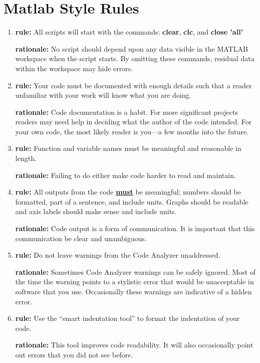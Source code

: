 \documentclass{tufte-book}
\begin{document}
\chapter{Matlab Style Rules}
\begin{enumerate}
\item \textbf{rule:} All scripts will start with the commands: \textbf{clear}, \textbf{clc}, and \textbf{close 'all'}

\textbf{rationale:} No script should depend upon any data visible in the MATLAB workspace when the script starts.  By omitting these commands, residual data within the workspace may hide errors.

\item \textbf{rule:} Your code must be documented with enough details such that a reader unfamiliar with your work will know what you are doing.

\textbf{rationale:} Code documentation is a habit. For more significant projects readers may need help in deciding what the author of the code intended.  For your own code, the most likely reader is you---a few months into the future.

\item \textbf{rule:} Function and variable names must be meaningful and reasonable in length.

\textbf{rationale:} Failing to do either make code harder to read and maintain.

\item \textbf{rule:} All outputs from the code \underline{\textbf{must}} be meaningful; numbers should be formatted, part of a sentence, and include units. Graphs should be readable and axis labels should make sense and include units.

\textbf{rationale:} Code output is a form of communication. It is important that this communication be clear and unambiguous.

\item \textbf{rule:} Do not leave warnings from the Code Analyzer unaddressed.

\textbf{rationale:} Sometimes Code Analyzer warnings can be safely ignored.  Most of the time the warning points to a stylistic error that would be unacceptable in software that you use. Occasionally these warnings are indicative of a hidden error.

\item \textbf{rule:} Use the ``smart indentation tool'' to format the indentation of your code.

\textbf{rationale:} This tool improves code readability. It will also occasionally point out errors that you did not see before.


\end{enumerate}
\end{document}
